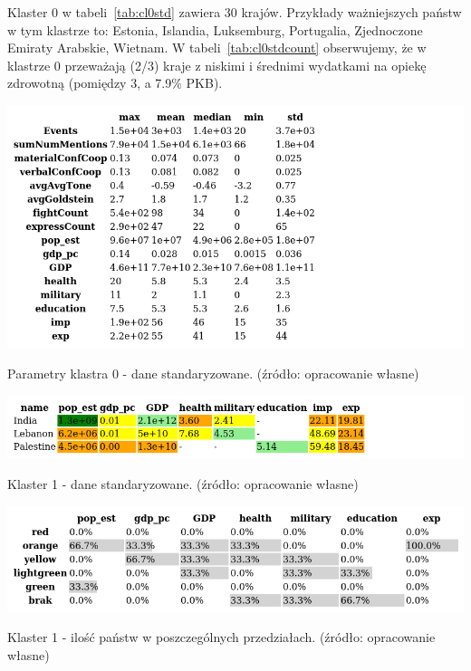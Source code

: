 \documentclass[11pt]{report}
\begin{document}
    Klaster 0 w tabeli~\ref{tab:cl0std} zawiera 30 krajów.
    Przykłady ważniejszych państw w tym klastrze to: Estonia, Islandia, Luksemburg, Portugalia, Zjednoczone Emiraty Arabskie, Wietnam.
    W tabeli~\ref{tab:cl0stdcount} obserwujemy, że w klastrze 0 przeważają (2/3) kraje z niskimi i średnimi wydatkami na opiekę zdrowotną (pomiędzy 3, a 7.9\% PKB).

    \begin{table}[!htp]
        \centering
        \includegraphics[width=\linewidth]{tables/CLUST/desc/clust0std_desc.png}
        \caption{Parametry klastra 0 - dane standaryzowane. (źródło: opracowanie własne)}
        \label{tab:cl0std_desc}
    \end{table}

    \begin{table}[!htp]
        \centering
        \includegraphics[width=\linewidth]{tables/CLUST/cluster1stdkmeans.png}
        \caption{Klaster 1 - dane standaryzowane. (źródło: opracowanie własne)}
        \label{tab:cl1std}
    \end{table}

    \begin{table}[!htp]
        \centering
        \includegraphics[width=\linewidth]{tables/CLUST/cluster1stdkmeanscount.png}
        \caption{Klaster 1 - ilość państw w poszczególnych przedziałach. (źródło: opracowanie własne)}
        \label{tab:cl1stdcount}
    \end{table}
\end{document}

